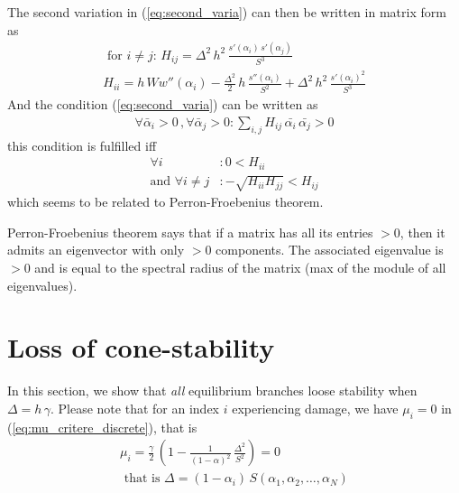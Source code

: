\documentclass[final,3p,times,authoryear]{elsarticle}
\begin{document}
The second variation in (\ref{eq:second_varia}) can then be written in matrix form as
\begin{subequations}
\begin{align}
\label{eq:second_varia_discrete}
\text{ for } i \neq j: \, H_{ij} = \Delta^2 \, h^2 \,  \frac{s'(\alpha_i) \, s'(\alpha_j)}{S^3} \\
%
H_{ii} = h\, W w''(\alpha_i) - \frac{\Delta^2}{2} \, h \,  \frac{s''(\alpha_i)}{S^2}  + \Delta^2 \, h^2 \,  \frac{s'(\alpha_i)^2}{S^3} \label{eq_Hii}
\end{align}
\end{subequations}
And the condition (\ref{eq:second_varia}) can be written as
\begin{align}
\label{eq:cond_second_varia_discrete}
\forall  \bar{\alpha}_i >0 \, , \forall  \bar{\alpha}_j >0  : \sum_{i,j} H_{ij} \, \bar{\alpha_i} \, \bar{{\alpha_j}} >0
\end{align}
this condition is fulfilled iff 
\begin{subequations}
\begin{align}
\label{eq:cond_second_varia_discrete_bis}
\forall  i  &:  0 < H_{ii}  \\
\text{and } \forall  i \neq j  &:  - \sqrt{H_{ii} H_{jj} } < H_{ij}
\end{align}
\end{subequations}
which seems to be related to Perron-Froebenius theorem.

Perron-Froebenius theorem says that if a matrix has all its entries $>0$, then it admits an eigenvector with only $>0$ components. The associated eigenvalue is $>0$ and is equal to the spectral radius of the matrix (max of the module of all eigenvalues).


%
%
%
%
%
%
%
\section{Loss of cone-stability} \label{sec:loss_stab}
%
%
%
%
%
%
%
In this section, we show that {\em all} equilibrium branches loose stability when $\Delta=h \, \gamma$.
Please note that for an index $i$ experiencing damage, we have $\mu_i=0$ in (\ref{eq:mu_critere_discrete}), that is
\begin{subequations}
\begin{align}
\mu_i = \frac{\gamma}{2} \, \left( 1 - \frac{1}{(1-\alpha)^2} \, \frac{\Delta^2}{S^2} \right)=0 \label{eq:mui_active} \\
\text{ that is } \Delta = (1-\alpha_i) \, S(\alpha_1, \alpha_2, \ldots, \alpha_N) \label{eq:rel_delta_S}
\end{align}
\end{subequations}
\end{document}
